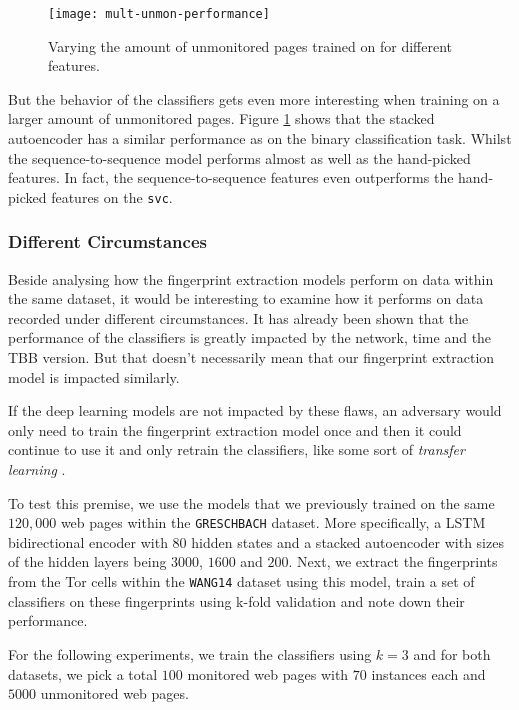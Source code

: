 \begin{figure}[!htb]
  \centering
  \texttt{[image: mult-unmon-performance]}
  \caption{Varying the amount of unmonitored pages trained on for different features.}
  \label{fig:mult-unmon-performance}
\end{figure}

But the behavior of the classifiers gets even more interesting when training on a larger amount of unmonitored pages.
Figure \ref{fig:mult-unmon-performance} shows that the stacked autoencoder has a similar performance as on the binary classification task.
Whilst the sequence-to-sequence model performs almost as well as the hand-picked features.
In fact, the sequence-to-sequence features even outperforms the hand-picked features on the \texttt{svc}.

\subsubsection{Different Circumstances}

Beside analysing how the fingerprint extraction models perform on data within the same dataset, it would be interesting to examine how it performs on data recorded under different circumstances.
It has already been shown that the performance of the classifiers is greatly impacted by the network, time and the TBB version.
But that doesn't necessarily mean that our fingerprint extraction model is impacted similarly.

If the deep learning models are not impacted by these flaws, an adversary would only need to train the fingerprint extraction model once and then it could continue to use it and only retrain the classifiers, like some sort of \textit{transfer learning} \cite{transfer_learning}.

To test this premise, we use the models that we previously trained on the same $120,000$ web pages within the \texttt{GRESCHBACH} dataset.
More specifically, a LSTM bidirectional encoder with $80$ hidden states and a stacked autoencoder with sizes of the hidden layers being $3000$, $1600$ and $200$.
Next, we extract the fingerprints from the Tor cells within the \texttt{WANG14} dataset using this model, train a set of classifiers on these fingerprints using k-fold validation and note down their performance.

For the following experiments, we train the classifiers using $k = 3$ and for both datasets, we  pick a total $100$ monitored web pages with $70$ instances each and $5000$ unmonitored web pages.

